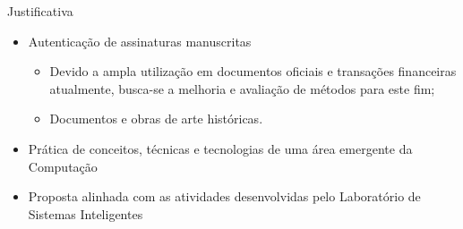 
\begin{frame}{Justificativa}
	\begin{itemize}
		\item Autenticação de assinaturas manuscritas
		\begin{itemize}
			\item Devido a ampla utilização em documentos oficiais e transações
			financeiras atualmente, busca-se a melhoria e avaliação de métodos para este fim;
			\item Documentos e obras de arte históricas.
		\end{itemize}
		\bigskip
		\item Prática de conceitos, técnicas e tecnologias de uma área emergente da Computação
		\bigskip
		\item Proposta alinhada com as atividades desenvolvidas pelo \alert{Laboratório de Sistemas Inteligentes}
	\end{itemize}
\end{frame}
